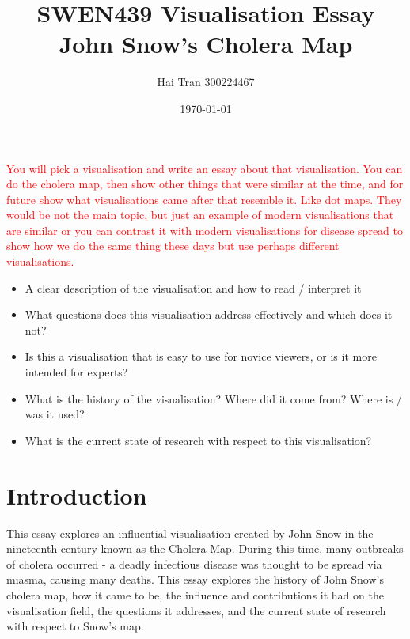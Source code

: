 \documentclass[12pt]{article}
\title{SWEN439 Visualisation Essay \\ John Snow's Cholera Map}
\author{Hai Tran 300224467}
\date{\today}
\begin{document}
\maketitle 

\begin{abstract}

\end{abstract}
\textcolor{red}{
You will pick a visualisation and write an essay about that visualisation. 
You can do the cholera map, then show other things that were similar at the time, and for future show what visualisations came after that resemble it. Like dot maps. They would be not the main topic, but just an example of modern visualisations that are similar or you can contrast it with modern visualisations for disease spread to show how we do the same thing these days but use perhaps different visualisations.
}

\begin{itemize}
\item A clear description of the visualisation and how to read / interpret it
\item What questions does this visualisation address effectively and which does it not?
\item Is this a visualisation that is easy to use for novice viewers, or is it more intended for experts?
\item What is the history of the visualisation? Where did it come from? Where is / was it used?
\item What is the current state of research with respect to this visualisation?
\end{itemize}

\section{Introduction}

This essay explores an influential visualisation created by John Snow in the nineteenth century known as the Cholera Map. During this time, many outbreaks of cholera occurred - a deadly infectious disease was thought to be spread via miasma, causing many deaths. This essay explores the history of John Snow's cholera map, how it came to be, the influence and contributions it had on the visualisation field, the questions it addresses, and the current state of research with respect to Snow's map. 
\end{document}
